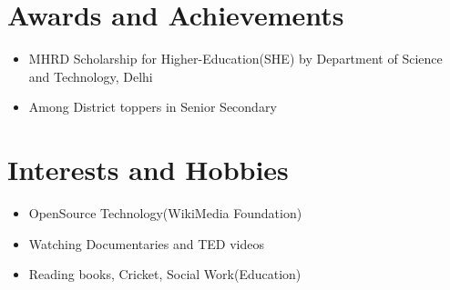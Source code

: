 \documentclass{article}
\begin{document}
\vspace*{.3cm}
\section{Awards and Achievements}
\vspace*{2mm}
\begin{itemize}
\item MHRD Scholarship for Higher-Education(SHE) by Department of Science and Technology, Delhi
\item Among District toppers in Senior Secondary
\end{itemize}

\vspace*{4mm}
\section{Interests and Hobbies}
\vspace*{2mm}
\begin{itemize}
\item OpenSource Technology(WikiMedia Foundation)
\item Watching Documentaries and TED videos
\item Reading books, Cricket, Social Work(Education)
\end{itemize}
%
\end{document}
